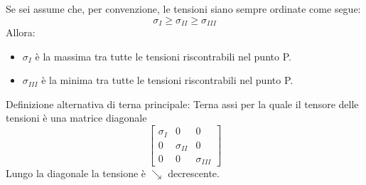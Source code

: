 \documentclass{article}
\begin{document}
\begin{adjustwidth}{2in}{}
	 Se sei assume che, per convenzione, le tensioni siano sempre ordinate come segue:
	 \[ \sigma_I \geq \sigma_{II} \geq \sigma_{III}\]
	 Allora: 
	 \begin{itemize}
	 	\item $ \sigma_I $ è la massima tra tutte le tensioni riscontrabili nel punto P.
	 	\item $ \sigma_{III} $ è la minima tra tutte le tensioni riscontrabili nel punto P. 
	 \end{itemize} 
 
  	Definizione alternativa di terna principale: Terna assi per la quale il tensore delle tensioni è una matrice diagonale
  	\[
  	\left[\begin{array}{ccc}
  		\sigma_I & 0 & 0 \\
  		0 & \sigma_{II} & 0 \\
  		0 & 0 & \sigma_{III}
  	\end{array} \right]
  	\]
  	Lungo la diagonale la tensione è $\searrow $ decrescente. \newline  	
  	

\end{adjustwidth}
\end{document}
